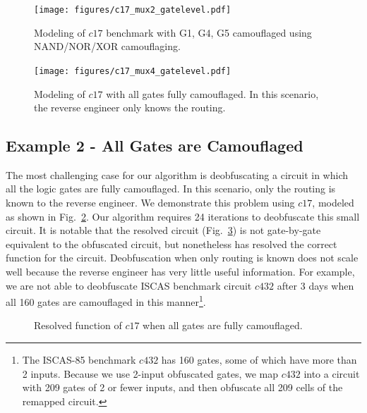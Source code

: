 \documentclass[proposal]{umassthesis}  %
\begin{document}
\begin{figure}[!htb] 
\begin{center}
\texttt{[image: figures/c17\_mux2\_gatelevel.pdf]}
\caption{Modeling of $c17$ benchmark with G1, G4, G5 camouflaged using NAND/NOR/XOR camouflaging.}
\label{fig:c17_mux2}
\end{center}
\end{figure}

\begin{figure}[!htb] 
\begin{center}
\texttt{[image: figures/c17\_mux4\_gatelevel.pdf]}
\caption{Modeling of $c17$ with all gates fully camouflaged. In this scenario, the reverse engineer only knows the routing.}
\label{fig:c17_mux4}
\end{center}
\end{figure}



\subsection{Example 2 - All Gates are Camouflaged}

The most challenging case for our algorithm is deobfuscating a circuit in which all the logic gates are fully camouflaged. In this scenario, only the routing is known to the reverse engineer. We demonstrate this problem using $c17$, modeled as shown in Fig.~\ref{fig:c17_mux4}. Our algorithm requires 24 iterations to deobfuscate this small circuit. It is notable that the resolved circuit (Fig.~\ref{fig:c17_all}) is not gate-by-gate equivalent to the obfuscated circuit, but nonetheless has resolved the correct function for the circuit. Deobfuscation when only routing is known does not scale well because the reverse engineer has very little useful information. For example, we are not able to deobfuscate ISCAS benchmark circuit $c432$ after 3 days when all 160 gates are camouflaged in this manner\footnote{The ISCAS-85 benchmark $c432$ has 160 gates, some of which have more than 2 inputs. Because we use 2-input obfuscated gates, we map $c432$ into a circuit with 209 gates of 2 or fewer inputs, and then obfuscate all 209 cells of the remapped circuit.}.


\begin{figure}[htb] 
\begin{center}
\caption{Resolved function of $c17$ when all gates are fully camouflaged.}
\label{fig:c17_all}
\end{center}
\end{figure}
\end{document}
